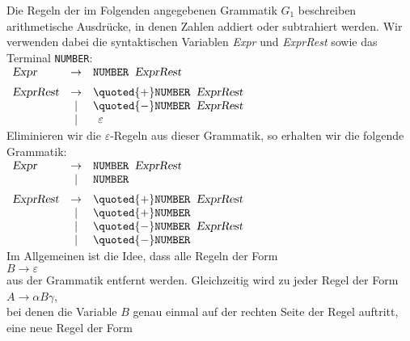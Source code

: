 \example
Die Regeln der im Folgenden angegebenen Grammatik $G_1$ beschreiben arithmetische Ausdr\"ucke,
in denen Zahlen addiert oder subtrahiert werden.  Wir verwenden dabei die syntaktischen Variablen
\textsl{Expr} und \textsl{ExprRest} sowie das Terminal \texttt{NUMBER}:
\\[0.2cm]
\hspace*{1.3cm}
$
\begin{array}[t]{lcl}
\textsl{Expr}     & \rightarrow & \texttt{NUMBER} \;\;\textsl{ExprRest} \\[0.2cm]
\textsl{ExprRest} & \rightarrow & \quoted{+} \texttt{NUMBER}\;\; \textsl{ExprRest} \\
                  & \mid        & \quoted{-} \texttt{NUMBER}\;\; \textsl{ExprRest} \\
                  & \mid        & \;\,\varepsilon 
\end{array}
$
\\[0.2cm]
Eliminieren wir die $\varepsilon$-Regeln aus dieser Grammatik, so erhalten wir die folgende Grammatik:
\\[0.2cm]
\hspace*{1.3cm}
$
\begin{array}[t]{lcl}
\textsl{Expr}     & \rightarrow & \texttt{NUMBER} \;\;\textsl{ExprRest} \\
                  & \mid        & \texttt{NUMBER} \\[0.2cm]
\textsl{ExprRest} & \rightarrow & \quoted{+} \texttt{NUMBER}\;\; \textsl{ExprRest} \\
                  & \mid        & \quoted{+} \texttt{NUMBER}                       \\
                  & \mid        & \quoted{-} \texttt{NUMBER}\;\; \textsl{ExprRest} \\
                  & \mid        & \quoted{-} \texttt{NUMBER}               
\end{array}
$
\\[0.2cm]
Im Allgemeinen ist die Idee, dass alle Regeln der Form
\\[0.2cm]
\hspace*{1.3cm}
$B \rightarrow \varepsilon$
\\[0.2cm]
aus der Grammatik entfernt werden.  Gleichzeitig wird zu jeder Regel der Form
\\
\hspace*{1.3cm}
$A \rightarrow \alpha B \gamma$,
\\[0.2cm]
bei denen die Variable $B$ genau einmal auf der rechten Seite der Regel auftritt, eine neue Regel der Form
